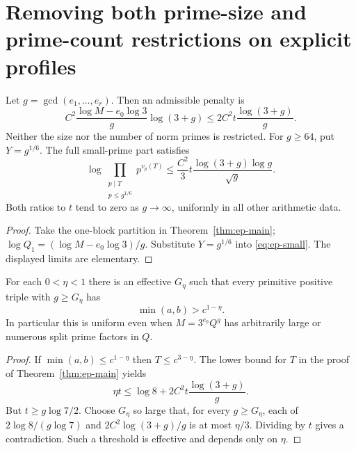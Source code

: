 \section{Removing both prime-size and prime-count restrictions on explicit profiles}
\label{sec:ep-classes}
\begin{corollary}\label{cor:ep-content}
Let $g=\gcd(e_1,\ldots,e_r)$. Then an admissible penalty is
\[
 C^2\frac{\log M-e_0\log3}{g}\log(3+g)
 \le2C^2t\frac{\log(3+g)}g.
\]
Neither the size nor the number of norm primes is restricted. For $g\ge64$,
put $Y=g^{1/6}$. The full small-prime part satisfies
\begin{equation}\label{eq:ep-content-small}
 \log\prod_{\substack{p\mid T\\p\le g^{1/6}}}p^{v_p(T)}
 \le\frac{C^2}{3}t\frac{\log(3+g)\log g}{\sqrt g}.
\end{equation}
Both ratios to $t$ tend to zero as $g\longrightarrow\infty$, uniformly in
all other arithmetic data.
\end{corollary}
\begin{proof}
Take the one-block partition in Theorem~\ref{thm:ep-main};
$\log Q_1=(\log M-e_0\log3)/g$. Substitute $Y=g^{1/6}$ into
\eqref{eq:ep-small}. The displayed limits are elementary.
\end{proof}

\begin{corollary}
\label{cor:ep-unbalanced}
For each $0<\eta<1$ there is an effective $G_\eta$ such that every primitive
positive triple with $g\ge G_\eta$ has
\[
 \min(a,b)>c^{1-\eta}.
\]
In particular this is uniform even when $M=3^{e_0}Q^g$ has arbitrarily large
or numerous split prime factors in $Q$.
\end{corollary}
\begin{proof}
If $\min(a,b)\le c^{1-\eta}$ then $T\le c^{3-\eta}$.
The lower bound for $T$ in the proof of Theorem~\ref{thm:ep-main} yields
\[
 \eta t\le\log8+2C^2t\frac{\log(3+g)}g.
\]
But $t\ge g\log7/2$. Choose $G_\eta$ so large that, for every
$g\ge G_\eta$, each of $2\log8/(g\log7)$ and
$2C^2\log(3+g)/g$ is at most $\eta/3$. Dividing by $t$ gives a
contradiction. Such a threshold is effective and depends only on $\eta$.
\end{proof}

